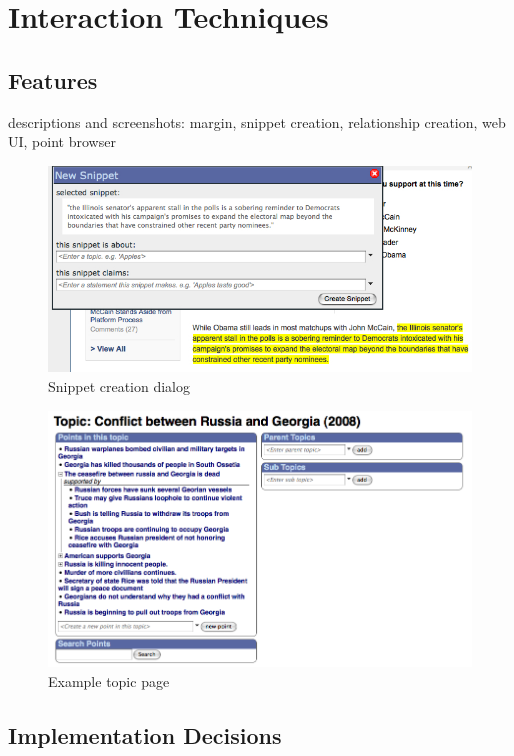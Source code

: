 \documentclass{chi2009}
\begin{document}
\section{Interaction Techniques}

\subsection{Features}
descriptions and screenshots: margin, snippet creation, relationship creation, web UI, point browser
\begin{figure}[ht]
	\includegraphics[scale=0.35]{../screenshots/snippetdialog_sm.jpg}
	\caption{Snippet creation dialog}
	\label{snippetdialog}
\end{figure}

\begin{figure}[ht]
	\includegraphics[scale=0.3]{../screenshots/topicpage_sm.jpg}
	\caption{Example topic page}
	\label{topicpage}
\end{figure}

\subsection{Implementation Decisions}
\end{document}

